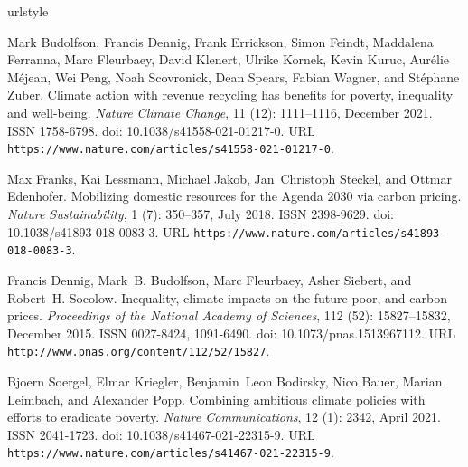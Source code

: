 \begin{thebibliography}{55}
  \providecommand{\natexlab}[1]{#1}
  \providecommand{\url}[1]{\texttt{#1}}
  \expandafter\ifx\csname urlstyle\endcsname\relax
    \providecommand{\doi}[1]{doi: #1}\else
    \providecommand{\doi}{doi: \begingroup \urlstyle{rm}\Url}\fi
  
  Mark Budolfson, Francis Dennig, Frank Errickson, Simon Feindt, Maddalena
    Ferranna, Marc Fleurbaey, David Klenert, Ulrike Kornek, Kevin Kuruc,
    Aur{\'e}lie M{\'e}jean, Wei Peng, Noah Scovronick, Dean Spears, Fabian
    Wagner, and St{\'e}phane Zuber.
  \newblock Climate action with revenue recycling has benefits for poverty,
    inequality and well-being.
  \newblock \emph{Nature Climate Change}, 11 (12): 1111--1116,
    December 2021.
  \newblock ISSN 1758-6798.
  \newblock \doi{10.1038/s41558-021-01217-0}.
  \newblock URL \url{https://www.nature.com/articles/s41558-021-01217-0}.
  
  Max Franks, Kai Lessmann, Michael Jakob, Jan~Christoph Steckel, and Ottmar
    Edenhofer.
  \newblock Mobilizing domestic resources for the {{Agenda}} 2030 via carbon
    pricing.
  \newblock \emph{Nature Sustainability}, 1 (7): 350--357, July
    2018.
  \newblock ISSN 2398-9629.
  \newblock \doi{10.1038/s41893-018-0083-3}.
  \newblock URL \url{https://www.nature.com/articles/s41893-018-0083-3}.
  
  Francis Dennig, Mark~B. Budolfson, Marc Fleurbaey, Asher Siebert, and Robert~H.
    Socolow.
  \newblock Inequality, climate impacts on the future poor, and carbon prices.
  \newblock \emph{Proceedings of the National Academy of Sciences}, 112
    (52): 15827--15832, December 2015.
  \newblock ISSN 0027-8424, 1091-6490.
  \newblock \doi{10.1073/pnas.1513967112}.
  \newblock URL \url{http://www.pnas.org/content/112/52/15827}.
  
  Bjoern Soergel, Elmar Kriegler, Benjamin~Leon Bodirsky, Nico Bauer, Marian
    Leimbach, and Alexander Popp.
  \newblock Combining ambitious climate policies with efforts to eradicate
    poverty.
  \newblock \emph{Nature Communications}, 12 (1): 2342, April
    2021.
  \newblock ISSN 2041-1723.
  \newblock \doi{10.1038/s41467-021-22315-9}.
  \newblock URL \url{https://www.nature.com/articles/s41467-021-22315-9}.
  

\end{thebibliography}
